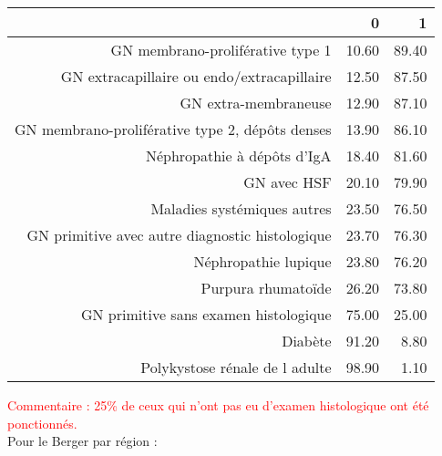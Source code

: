 \documentclass[11pt,a4paper]{article}\usepackage[]{graphicx}\usepackage[]{color}
\begin{document}
\begin{table}[H]
\centering
\begin{tabular}{rrr}
  \hline
 & 0 & 1 \\ 
  \hline
GN membrano-proliférative type 1 & 10.60 & 89.40 \\ 
  GN extracapillaire ou endo/extracapillaire & 12.50 & 87.50 \\ 
  GN extra-membraneuse & 12.90 & 87.10 \\ 
  GN membrano-proliférative type 2, dépôts denses & 13.90 & 86.10 \\ 
  Néphropathie à dépôts d'IgA & 18.40 & 81.60 \\ 
  GN avec HSF & 20.10 & 79.90 \\ 
  Maladies systémiques autres & 23.50 & 76.50 \\ 
  GN primitive avec autre diagnostic histologique & 23.70 & 76.30 \\ 
  Néphropathie lupique & 23.80 & 76.20 \\ 
  Purpura rhumatoïde & 26.20 & 73.80 \\ 
  GN primitive sans examen histologique & 75.00 & 25.00 \\ 
  Diabète & 91.20 & 8.80 \\ 
  Polykystose rénale de l adulte & 98.90 & 1.10 \\ 
   \hline
\end{tabular}
\end{table}


\textcolor{red}{Commentaire : 25\% de ceux qui n'ont pas eu d'examen histologique ont été ponctionnés.}
~\\

Pour le Berger par région :
\end{document}
